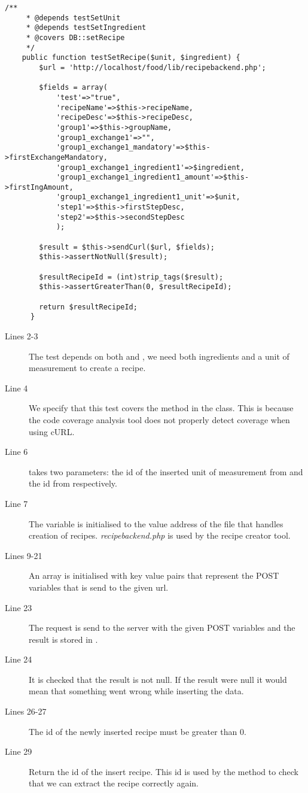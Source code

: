 \begin{lstlisting}[language=phpstyle]
    /**
     * @depends testSetUnit
     * @depends testSetIngredient
     * @covers DB::setRecipe
     */
    public function testSetRecipe($unit, $ingredient) {
        $url = 'http://localhost/food/lib/recipebackend.php';

        $fields = array(
            'test'=>"true",
            'recipeName'=>$this->recipeName,
            'recipeDesc'=>$this->recipeDesc,
            'group1'=>$this->groupName,
            'group1_exchange1'=>"",
            'group1_exchange1_mandatory'=>$this->firstExchangeMandatory,
            'group1_exchange1_ingredient1'=>$ingredient,
            'group1_exchange1_ingredient1_amount'=>$this->firstIngAmount,
            'group1_exchange1_ingredient1_unit'=>$unit,
            'step1'=>$this->firstStepDesc,
            'step2'=>$this->secondStepDesc
            );
        
        $result = $this->sendCurl($url, $fields);
        $this->assertNotNull($result);
            
        $resultRecipeId = (int)strip_tags($result);
        $this->assertGreaterThan(0, $resultRecipeId);
        
        return $resultRecipeId;
      }
\end{lstlisting}

\begin{description}
\item[Lines 2-3] The test depends on both  and , we need both ingredients and a unit of measurement to create a recipe.
\item[Line 4] We specify that this test covers the  method in the  class. This is because the code coverage analysis tool does not properly detect coverage when using cURL\cite{curl}.
\item[Line 6]  takes two parameters: the id of the inserted unit of measurement from  and the id from  respectively.
\item[Line 7] The  variable is initialised to the value address of the file that handles creation of recipes. \textit{recipebackend.php} is used by the recipe creator tool.%
\item[Lines 9-21] An array is initialised with key value pairs that represent the POST variables that is send to the given url.
\item[Line 23] The request is send to the server with the given POST variables and the result is stored in .%
\item[Line 24] It is checked that the result is not null. If the result were null it would mean that something went wrong while inserting the data.
\item[Lines 26-27] The id of the newly inserted recipe must be greater than 0.
\item[Line 29] Return the id of the insert recipe. This id is used by the  method to check that we can extract the recipe correctly again.
\end{description}

